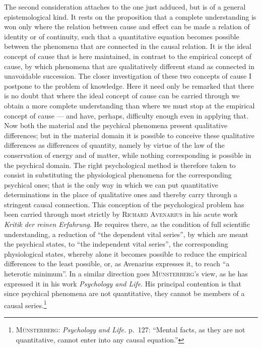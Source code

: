 \documentclass[12pt,a4paper]{book}
\newcommand{\opage}[1]{\marginnote{\footnotesize\textit{[#1]}}}
\begin{document}
The second consideration attaches to the one just adduced, but is of a general
epistemological kind. It rests on the proposition that a complete understanding
is won only where the relation between cause and effect can be made a relation
of identity or of continuity, such that a quantitative equation becomes possible
between the phenomena that are connected in the causal relation. It is the ideal
concept of cause that is here maintained, in \opage{15}contrast to the empirical concept
of cause, by which phenomena that are qualitatively different stand as connected
in unavoidable succession. The closer investigation of these two concepts of
cause I postpone to the problem of knowledge. Here it need only be remarked that
there is no doubt that where the ideal concept of cause can be carried through
we obtain a more complete understanding than where we must stop at the empirical
concept of cause --- and have, perhaps, difficulty enough even in applying that.
Now both the material and the psychical phenomena present qualitative
differences; but in the material domain it is possible to conceive these
qualitative differences as differences of quantity, namely by virtue of the law
of the conservation of energy and of matter, while nothing corresponding is
possible in the psychical domain. The right psychological method is therefore
taken to consist in substituting the physiological phenomena for the
corresponding psychical ones; that is the only way in which we can put
quantitative determinations in the place of qualitative ones and thereby carry
through a stringent causal connection. This conception of the psychological
problem has been carried through most strictly by \textsc{Richard Avenarius} in
his acute work \textit{Kritik der reinen Erfahrung}. He requires there, as the
condition of full scientific understanding, a reduction of ``the dependent vital
series'', by which are meant the psychical states, to ``the independent vital
series'', the corresponding physiological states, whereby alone it becomes
possible to reduce the empirical differences to the least possible, or, as
Avenarius expresses it, to reach ``a heterotic minimum''. In a similar direction
goes \textsc{Münsterberg}'s view, as he has expressed it in his work
\textit{Psychology and Life}. His principal contention is that since psychical
phenomena are not quantitative, they cannot be members of a causal
series.\footnote{\textsc{Münsterberg}: \textit{Psychology and Life.} p.~127:
``Mental facts, as they are not quantitative, cannot enter into any causal
equation.''}
\end{document}
